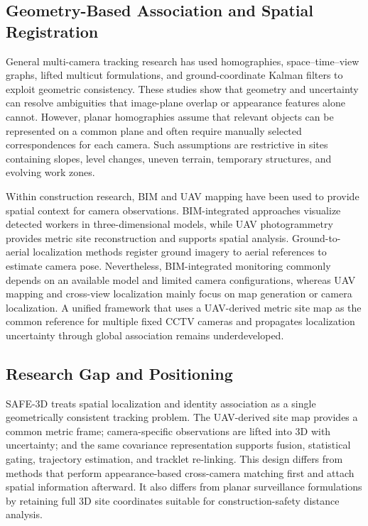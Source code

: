 \subsection{Geometry-Based Association and Spatial Registration}
General multi-camera tracking research has used homographies, space--time--view graphs, lifted multicut formulations, and ground-coordinate Kalman filters to exploit geometric consistency. These studies show that geometry and uncertainty can resolve ambiguities that image-plane overlap or appearance features alone cannot. However, planar homographies assume that relevant objects can be represented on a common plane and often require manually selected correspondences for each camera. Such assumptions are restrictive in sites containing slopes, level changes, uneven terrain, temporary structures, and evolving work zones.

Within construction research, BIM and UAV mapping have been used to provide spatial context for camera observations. BIM-integrated approaches visualize detected workers in three-dimensional models, while UAV photogrammetry provides metric site reconstruction and supports spatial analysis. Ground-to-aerial localization methods register ground imagery to aerial references to estimate camera pose. Nevertheless, BIM-integrated monitoring commonly depends on an available model and limited camera configurations, whereas UAV mapping and cross-view localization mainly focus on map generation or camera localization. A unified framework that uses a UAV-derived metric site map as the common reference for multiple fixed CCTV cameras and propagates localization uncertainty through global association remains underdeveloped.

\subsection{Research Gap and Positioning}
SAFE-3D treats spatial localization and identity association as a single geometrically consistent tracking problem. The UAV-derived site map provides a common metric frame; camera-specific observations are lifted into 3D with uncertainty; and the same covariance representation supports fusion, statistical gating, trajectory estimation, and tracklet re-linking. This design differs from methods that perform appearance-based cross-camera matching first and attach spatial information afterward. It also differs from planar surveillance formulations by retaining full 3D site coordinates suitable for construction-safety distance analysis.

